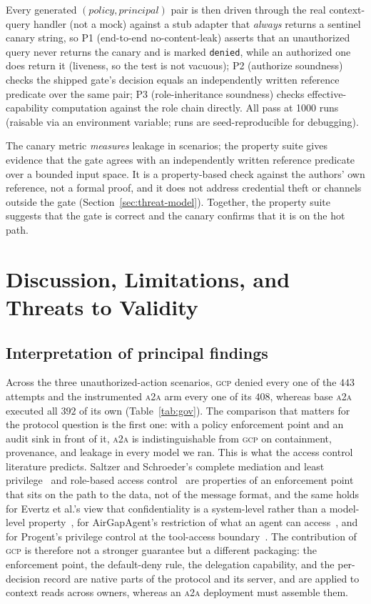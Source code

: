 \documentclass[conference,letterpaper]{IEEEtran}
\newcommand{\gcp}{\textsc{gcp}}
\newcommand{\ata}{\textsc{a2a}}
\begin{document}
Every generated $(policy,principal)$ pair is then
driven through the real context-query handler (not a mock) against a stub adapter that
\emph{always} returns a sentinel canary string, so P1 (end-to-end no-content-leak) asserts that an
unauthorized query never returns the canary and is marked \texttt{denied}, while an authorized one
does return it (liveness, so the test is not vacuous); P2 (authorize soundness) checks the shipped
gate's decision equals an independently written reference predicate over the same pair; P3
(role-inheritance soundness) checks effective-capability computation against the role chain directly.
All pass at 1000 runs (raisable via an environment variable; runs are seed-reproducible for
debugging).

The canary metric \emph{measures} leakage in scenarios; the property suite gives evidence that the gate agrees with an independently written reference predicate over a bounded input space. It is a property-based check against the authors' own reference, not a formal proof, and it does not
address credential theft or channels outside the gate (Section~\ref{sec:threat-model}). Together, the
property suite suggests that the gate is correct and the canary confirms that it is on the hot path.

\section{Discussion, Limitations, and Threats to Validity}
\label{sec:threats}

\subsection{Interpretation of principal findings}
Across the three unauthorized-action scenarios, \gcp{} denied every one of the $443$ attempts and the
instrumented \ata{} arm every one of its $408$, whereas base \ata{} executed all $392$ of
its own (Table~\ref{tab:gov}). The comparison that matters for the protocol question is the first
one: with a policy enforcement point and an audit sink in front of it, \ata{} is indistinguishable
from \gcp{} on containment, provenance, and leakage in every model we ran. This is what the access
control literature predicts. Saltzer and Schroeder's complete mediation and least
privilege~\citep{saltzer1975} and role-based access control~\citep{sandhu1996} are properties of an
enforcement point that sits on the path to the data, not of the message format, and the same holds
for Evertz et al.'s view that confidentiality is a system-level rather than a model-level
property~\citep{evertz2024whispers}, for AirGapAgent's restriction of what an agent can
access~\citep{bagdasarian2024airgap}, and for Progent's privilege control at the tool-access
boundary~\citep{shi2025progent}. The contribution of \gcp{} is therefore not a stronger guarantee but
a different packaging: the enforcement point, the default-deny rule, the delegation capability, and
the per-decision record are native parts of the protocol and its server, and are applied to context
reads across owners, whereas an \ata{} deployment must assemble them.
\end{document}
